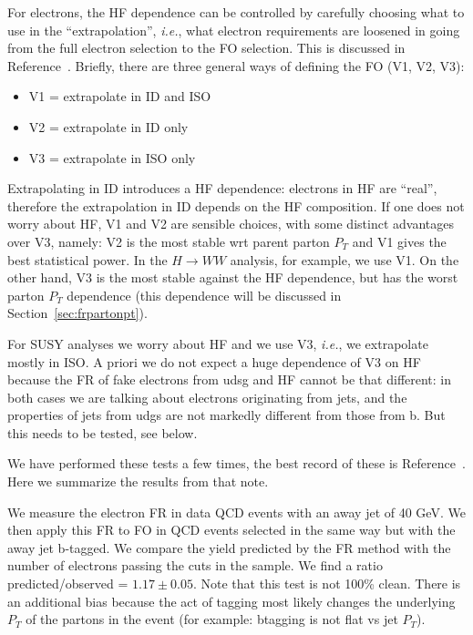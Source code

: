 For electrons, the HF dependence can be controlled by
carefully choosing what to use in the ``extrapolation'', {\it i.e.},
what electron requirements are loosened in going from the full
electron selection to the FO selection.  This is discussed in
Reference~\cite{frmethod}.  Briefly, there are three general
ways of defining the FO (V1, V2, V3):

\begin{itemize}
\item    V1 = extrapolate in ID and ISO
\item   V2 = extrapolate in ID only
\item   V3 = extrapolate in ISO only 
\end{itemize}

Extrapolating in ID introduces a HF dependence:
electrons in HF are ``real'', therefore the extrapolation in
ID depends on the HF composition.
If one does not worry about HF, V1 and V2 are sensible
choices, with some distinct advantages over V3, namely:
V2 is the most stable wrt parent parton $P_T$ and
V1 gives the best statistical power.
In the $H \to WW$ analysis, for example, we use V1.
On the other hand, V3 is the most stable against the HF dependence,
but has the worst parton $P_T$ dependence (this dependence
will be discussed in Section~\ref{sec:frpartonpt}).

For SUSY analyses we worry about HF and we use V3, {\it i.e.},
we extrapolate mostly in ISO.
A priori we do not expect a huge dependence of V3 on HF
because the FR of fake electrons from udsg and
HF cannot be that different: in both cases we are 
talking about electrons originating from jets, and the 
properties of jets from udgs are not markedly different 
from those from b.  But this needs to be tested, see below.

We have performed these tests a few times, the best record
of these is Reference~\cite{frmethod}.  Here we summarize 
the results from that note.

We measure the electron FR in data QCD events with an away jet of
40 GeV.  We then apply this FR to FO in QCD events selected 
in the same way but with the away jet b-tagged. We compare
the yield predicted by the FR method 
with the number of electrons passing the cuts in the sample. 
We find a ratio predicted/observed = $1.17 \pm 0.05$.
Note that this test is not 100\% clean.
There is an additional bias because the act
of tagging most likely changes the underlying $P_T$ of the
partons in the event (for example: btagging is not flat vs
jet $P_T$).  

